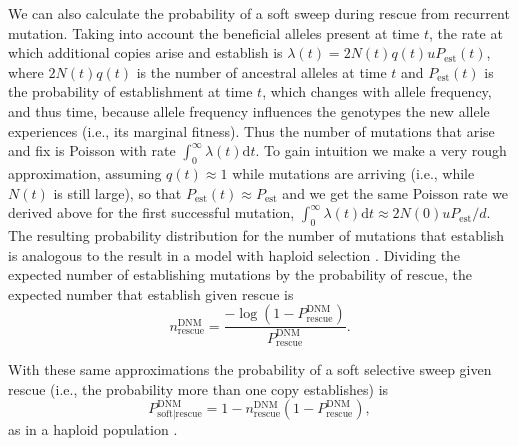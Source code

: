 \documentclass[]{article}
\begin{document}
We can also calculate the probability of a soft sweep during rescue from recurrent mutation.
Taking into account the beneficial alleles present at time $t$, the rate at which additional copies arise and establish is $\lambda(t) = 2 N(t) q(t) u P_\mathrm{est}(t)$, where $2 N(t) q(t)$ is the number of ancestral alleles at time $t$ and $P_\mathrm{est}(t)$ is the probability of establishment at time $t$, which changes with allele frequency, and thus time, because allele frequency influences the genotypes the new allele experiences (i.e., its marginal fitness).
Thus the number of mutations that arise and fix is Poisson with rate $\int_0^\infty \lambda(t) \mathrm{d} t$. 
To gain intuition we make a very rough approximation, assuming $q(t)\approx1$ while mutations are arriving (i.e., while $N(t)$ is still large), so that $P_\mathrm{est}(t)\approx P_\mathrm{est}$ and we get the same Poisson rate we derived above for the first successful mutation, $\int_0^\infty \lambda(t) \mathrm{d} t \approx 2N(0) u P_\mathrm{est}/d$.
The resulting probability distribution for the number of mutations that establish is analogous to the result in a model with haploid selection \citep[c.f., equation 7 in][]{wilson2017soft}.  
Dividing the expected number of establishing mutations by the probability of rescue, the expected number that establish given rescue is
\begin{equation}\label{eq:ENestDNM}
n^\mathrm{DNM}_\mathrm{rescue} = \frac{-\log(1-P_\mathrm{rescue}^\mathrm{DNM})}{P_\mathrm{rescue}^\mathrm{DNM}}.
\end{equation}

With these same approximations the probability of a soft selective sweep given rescue (i.e., the probability more than one copy establishes) is 
\begin{equation}\label{eq:PsoftDNM}
P_{\mathrm{soft}|\mathrm{rescue}}^{\mathrm{DNM}} = 1 - n^\mathrm{DNM}_\mathrm{rescue} (1-P_{\mathrm{rescue}}^{\mathrm{DNM}}),
\end{equation}
as in a haploid population \citep[equation 8 in][]{wilson2017soft}.
\end{document}
